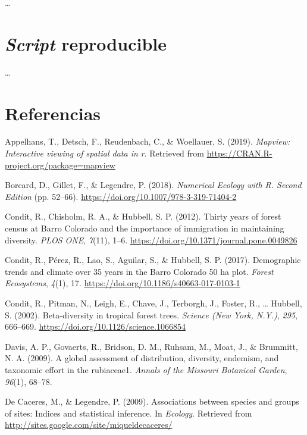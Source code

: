 \documentclass[11pt,]{article}
\begin{document}
\ldots

\section{\texorpdfstring{\emph{Script}
reproducible}{Script reproducible}}\label{script-reproducible}

\ldots

\section*{Referencias}\label{referencias}

\hypertarget{refs}{}
\hypertarget{ref-cita_mapview}{}
Appelhans, T., Detsch, F., Reudenbach, C., \& Woellauer, S. (2019).
\emph{Mapview: Interactive viewing of spatial data in r}. Retrieved from
\url{https://CRAN.R-project.org/package=mapview}

\hypertarget{ref-borcard_legendre}{}
Borcard, D., Gillet, F., \& Legendre, P. (2018). \emph{Numerical Ecology
with R. Second Edition} (pp. 52--66).
\url{https://doi.org/10.1007/978-3-319-71404-2}

\hypertarget{ref-condit_et_al_2012}{}
Condit, R., Chisholm, R. A., \& Hubbell, S. P. (2012). Thirty years of
forest census at Barro Colorado and the importance of immigration in
maintaining diversity. \emph{PLOS ONE}, \emph{7}(11), 1--6.
\url{https://doi.org/10.1371/journal.pone.0049826}

\hypertarget{ref-condit_et_al_2017}{}
Condit, R., Pérez, R., Lao, S., Aguilar, S., \& Hubbell, S. P. (2017).
Demographic trends and climate over 35 years in the Barro Colorado 50 ha
plot. \emph{Forest Ecosystems}, \emph{4}(1), 17.
\url{https://doi.org/10.1186/s40663-017-0103-1}

\hypertarget{ref-article_condit}{}
Condit, R., Pitman, N., Leigh, E., Chave, J., Terborgh, J., Foster, R.,
\ldots{} Hubbell, S. (2002). Beta-diversity in tropical forest trees.
\emph{Science (New York, N.Y.)}, \emph{295}, 666--669.
\url{https://doi.org/10.1126/science.1066854}

\hypertarget{ref-davis2009global}{}
Davis, A. P., Govaerts, R., Bridson, D. M., Ruhsam, M., Moat, J., \&
Brummitt, N. A. (2009). A global assessment of distribution, diversity,
endemism, and taxonomic effort in the rubiaceae1. \emph{Annals of the
Missouri Botanical Garden}, \emph{96}(1), 68--78.

\hypertarget{ref-cita_indicspecies}{}
De Caceres, M., \& Legendre, P. (2009). Associations between species and
groups of sites: Indices and statistical inference. In \emph{Ecology}.
Retrieved from \url{http://sites.google.com/site/miqueldecaceres/}
\end{document}
